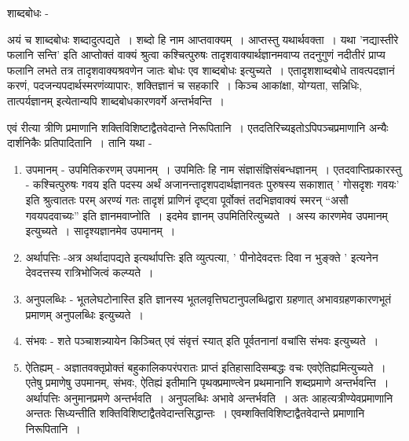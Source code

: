{शाब्दबोधः -

अयं च शाब्दबोधः शब्दादुत्पद्यते~। शब्दो हि नाम आप्तवाक्यम्~। आप्तस्तु यथार्थवक्ता~। यथा ’नद्यास्तीरे फलानि सन्ति’ इति आप्तोक्तं वाक्यं श्रुत्वा कश्चित्पुरुषः तादृशवाक्यार्थज्ञानमवाप्य तदनुगुणं नदीतीरं प्राप्य फलानि लभते तत्र तादृशवाक्यश्रवणेन जातः बोधः एव शाब्दबोधः इत्युच्यते~। एतादृशशाब्दबोधे तावत्पदज्ञानं करणं, पदजन्यपदार्थस्मरणंव्यापारः, शक्तिज्ञानं च सहकारि~। किञ्च आकांक्षा, योग्यता, सन्निधिः, तात्पर्यज्ञानम् इत्येतान्यपि शाब्दबोधकारणवर्गे अन्तर्भवन्ति~। 

एवं रीत्या त्रीणि प्रमाणानि शक्तिविशिष्टाद्वैतवेदान्ते निरूपितानि~। एतदतिरिच्यइतोऽपिपञ्चप्रमाणानि अन्यैः दार्शनिकैः प्रतिपादितानि~। तानि यथा -
\begin{enumerate}
\item उपमानम् - उपमितिकरणम् उपमानम्~। उपमितिः हि नाम संज्ञासंज्ञिसंबन्धज्ञानम्~। एतदवाप्तिप्रकारस्तु - कश्चित्पुरुषः गवय इति पदस्य अर्थं अजानन्तादृशपदार्थज्ञानवतः पुरुषस्य सकाशात् ’  गोसदृशः गवयः’ इति श्रुत्वाततः परम् अरण्यं गतः तादृशं प्राणिनं दृष्ट्वा पूर्वोक्तं तदभिज्ञवाक्यं स्मरन् “असौ गवयपदवाच्यः” इति ज्ञानमवाप्नोति~। इदमेव ज्ञानम् उपमितिरित्युच्यते~। अस्य कारणमेव उपमानम् इत्युच्यते~। सादृश्यज्ञानमेव उपमानम्~। 
\item अर्थापत्तिः -अत्र अर्थादापद्यते इत्यर्थापत्तिः इति व्युत्पत्या, ’ पीनोदेवदत्तः दिवा न भुङ्क्ते ’ इत्यनेन देवदत्तस्य रात्रिभोजित्वं कल्प्यते~। 
\item अनुपलब्धिः - भूतलेघटोनास्ति इति ज्ञानस्य भूतलवृत्तिघटानुपलब्धिद्वारा ग्रहणात् अभावग्रहणकारणभूतं प्रमाणम् अनुपलब्धिः इत्युच्यते~। 
\item संभवः - शते पञ्चाशन्न्यायेन किञ्चित् एवं संवृत्तं स्यात् इति पूर्वतनानां वचांसि संभवः इत्युच्यते~। 
\item ऐतिह्यम् - अज्ञातवक्तृप्रोक्तं बहुकालिकपरंपरातः प्राप्तं इतिहासादिसम्बद्धः वचः एवऐतिह्यमित्युच्यते~। एतेषु प्रमाणेषु उपमानम्, संभवः, ऐतिह्यं इतीमानि पृथक्प्रमाण्त्वेन प्रथमानानि शब्दप्रमाणे अन्तर्भवन्ति~। अर्थापत्तिः अनुमानप्रमणे अन्तर्भवति~। अनुपलब्धिः अभावे अन्तर्भवति~। अतः आहत्यत्रीण्येवप्रमाणानि अन्ततः सिध्यन्तीति शक्तिविशिष्टाद्वैतवेदान्तसिद्धान्तः~। 
एवम्शक्तिविशिष्टाद्वैतवेदान्ते प्रमाणानि निरूपितानि~। 
\end{enumerate}
\articleend
}
